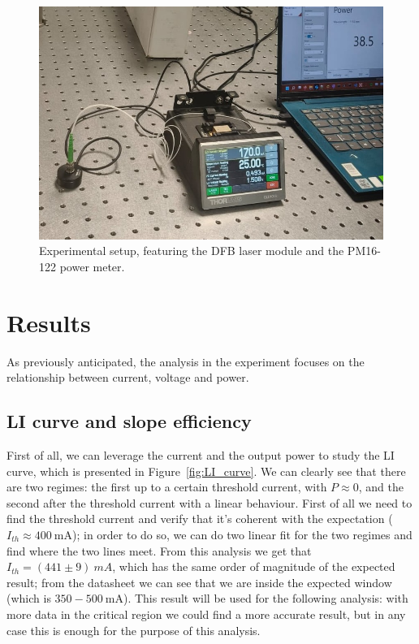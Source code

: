 \documentclass[prl,twocolumn]{revtex4-1}
\begin{document}
\begin{figure}
    \centering
    \includegraphics[width=\linewidth]{Images/setup.jpg}
    \caption{Experimental setup, featuring the DFB laser module and the PM16-122 power meter.}
    \label{fig:setup}
\end{figure}


\section{Results}
As previously anticipated, the analysis in the experiment focuses on the relationship between current, voltage and power.

\subsection{LI curve and slope efficiency}
First of all, we can leverage the current and the output power to study the LI curve, which is presented in Figure~\ref{fig:LI_curve}. We can clearly see that there are two regimes: the first up to a certain threshold current, with $P\approx0$, and the second after the threshold current with a linear behaviour. First of all we need to find the threshold current and verify that it's coherent with the expectation ($I_{th} \approx \SI{400}{\milli\ampere}$); in order to do so, we can do two linear fit for the two regimes and find where the two lines meet. From this analysis we get that $I_{th} = (441 \pm 9) \SI{}{mA}$, which has the same order of magnitude of the expected result; from the datasheet we can see that we are inside the expected window (which is $350-500\SI{}{\milli\ampere}$). This result will be used for the following analysis: with more data in the critical region we could find a more accurate result, but in any case this is enough for the purpose of this analysis.
\end{document}
